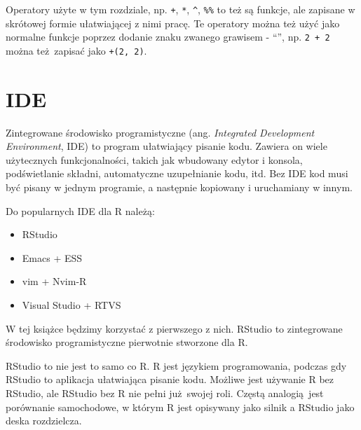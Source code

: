 \documentclass[paper=6in:9in,pagesize=pdftex,headinclude=on,footinclude=on,10pt]{scrbook}
\makeatletter
\providecommand{\tightlist}{%
  \setlength{\itemsep}{0pt}\setlength{\parskip}{0pt}}
\newenvironment{kframe}{%
\medskip{}
\setlength{\fboxsep}{.8em}
 \def\at@end@of@kframe{}%
 \ifinner\ifhmode%
  \def\at@end@of@kframe{\end{minipage}}%
  \begin{minipage}{\columnwidth}%
 \fi\fi%
 \def\FrameCommand##1{\hskip\@totalleftmargin \hskip-\fboxsep
 \colorbox{shadecolor}{##1}\hskip-\fboxsep
     \hskip-\linewidth \hskip-\@totalleftmargin \hskip\columnwidth}%
 \MakeFramed {\advance\hsize-\width
   \@totalleftmargin\z@ \linewidth\hsize
   \@setminipage}}%
 {\par\unskip\endMakeFramed%
 \at@end@of@kframe}
\newenvironment{rmdblock}[1]
  {
  \begin{itemize}
  \renewcommand{\labelitemi}{
    \raisebox{-.7\height}[0pt][0pt]{
      {\setkeys{Gin}{width=3em,keepaspectratio}\texttt{[image: images/\#1]}}
    }
  }
  \setlength{\fboxsep}{1em}
  \begin{kframe}
  \item
  }
  {
  \end{kframe}
  \end{itemize}
  }
\newenvironment{rmdinfo}
  {\begin{rmdblock}{compass}}
  {\end{rmdblock}}
\makeatother
\begin{document}
\begin{rmdinfo}
Operatory użyte w tym rozdziale, np. \texttt{+}, \texttt{*}, \texttt{\^{}}, \texttt{\%\%} to też są funkcje, ale zapisane w skrótowej formie ułatwiającej z nimi pracę.
Te operatory można też użyć jako normalne funkcje poprzez dodanie znaku zwanego grawisem - ``\texttt{\textasciigrave{}}'', np. \texttt{2\ +\ 2} można też~zapisać jako \texttt{\textasciigrave{}+\textasciigrave{}(2,\ 2)}.
\end{rmdinfo}

\hypertarget{ide}{%
\section{IDE}\label{ide}}

Zintegrowane środowisko programistyczne (ang. \emph{Integrated Development Environment}, IDE) to program ułatwiający pisanie kodu.
Zawiera on wiele użytecznych funkcjonalności, takich jak wbudowany edytor i konsola, podświetlanie składni, automatyczne uzupełnianie kodu, itd.
Bez IDE kod musi być pisany w jednym programie, a następnie kopiowany i uruchamiany w innym.

Do popularnych IDE dla R należą:

\begin{itemize}
\tightlist
\item
  RStudio
\item
  Emacs + ESS
\item
  vim + Nvim-R
\item
  Visual Studio + RTVS
\end{itemize}

W tej książce będzimy korzystać z pierwszego z nich.
RStudio to zintegrowane środowisko programistyczne pierwotnie stworzone dla R.

\begin{rmdinfo}
RStudio to nie jest to samo co R.
R jest językiem programowania, podczas gdy RStudio to aplikacja ułatwiająca pisanie kodu.
Możliwe jest używanie R bez RStudio, ale RStudio bez R nie pełni już~swojej roli.
Częstą analogią~jest porównanie samochodowe, w którym R jest opisywany jako silnik a RStudio jako deska rozdzielcza.
\end{rmdinfo}
\end{document}
